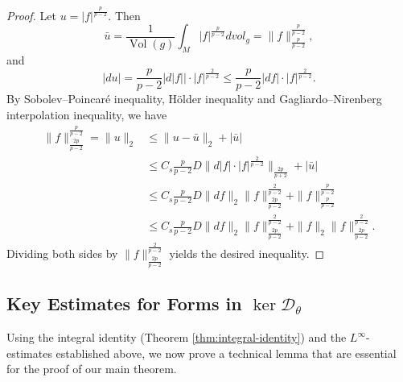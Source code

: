 \documentclass[12pt, twoside]{article}
\theoremstyle{definition}
\numberwithin{equation}{section}
\begin{document}
	\begin{proof}
		Let \(u=|f|^{\frac{p}{p-2}}\). Then
		\[
		\bar{u}=\frac{1}{\operatorname{Vol}(g)}\int_{M}|f|^{\frac{p}{p-2}}dvol_{g}
		=\|f\|_{\frac{p}{p-2}}^{\frac{p}{p-2}},
		\]
		and
		\[
		|du|=\frac{p}{p-2}|d|f||\cdot|f|^{\frac{2}{p-2}}
		\le\frac{p}{p-2}|df|\cdot|f|^{\frac{2}{p-2}}.
		\]    
		By Sobolev--Poincar\'{e} inequality, H\"{o}lder inequality and Gagliardo--Nirenberg interpolation inequality, we have
		\begin{align*}
		\|f\|^{\frac{p}{p-2} }_{\frac{2p}{p-2} }=\|u\|_{2}
		&\leq\|u-\bar{u}\|_{2}+|\bar{u}|\\
		&\leq C_{s}\frac{p}{p-2}D\|d|f|\cdot|f|^{\frac{2}{p-2}}\|_{\frac{2p}{p+2}}+|\bar{u}|\\
		&\leq C_{s}\frac{p}{p-2}D\|df\|_{2}\|f\|^{\frac{2}{p-2} }_{\frac{2p}{p-2}}+\|f\|^{\frac{p}{p-2} }_{\frac{p}{p-2}}\\
		&\leq C_{s}\frac{p}{p-2}D\|df\|_{2}\|f\|^{\frac{2}{p-2} }_{\frac{2p}{p-2}}+\|f\|_{2}\|f\|^{\frac{2}{p-2} }_{\frac{2p}{p-2}}.
		\end{align*}
		Dividing both sides by \(\|f\|_{\frac{2p}{p-2}}^{\frac{2}{p-2}}\) yields the desired inequality.
	\end{proof}


	\subsection{Key Estimates for Forms in \(\ker\mathcal{D}_{\theta}\)}


	Using the integral identity (Theorem \ref{thm:integral-identity}) and the \(L^{\infty}\)-estimates established above, we now prove a technical lemma that are essential for the proof of our main theorem.
	
\end{document}
